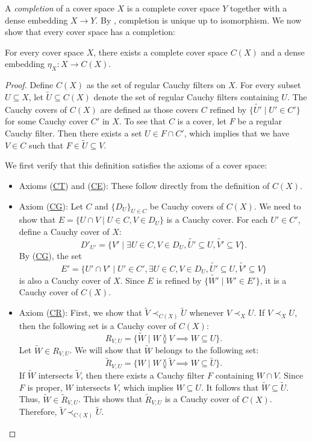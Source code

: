 \documentclass[pdflatex,sn-mathphys-num]{sn-jnl}
\newcommand{\axref}[1]{(\hyperref[ax:#1]{#1})}
\theoremstyle{definition}
\theoremstyle{remark}
\numberwithin{figure}{section}
\newcommand{\overlap}[2]{#1 \between #2}
\newcommand{\rb}{\prec}
\begin{document}
A \emph{completion} of a cover space $X$ is a complete cover space $Y$ together with a dense embedding $X \to Y$.
By , completion is unique up to isomorphism.
We now show that every cover space has a completion:

\begin{thm}[completion]
For every cover space $X$, there exists a complete cover space $C(X)$ and a dense embedding $\eta_X : X \to C(X)$.
\end{thm}
\begin{proof}
Define $C(X)$ as the set of regular Cauchy filters on $X$.
For every subset $U \subseteq X$, let $\widetilde{U} \subseteq C(X)$ denote the set of regular Cauchy filters containing $U$.
The Cauchy covers of $C(X)$ are defined as those covers $C$ refined by $\{ \widetilde{U'} \mid U' \in C' \}$ for some Cauchy cover $C'$ in $X$.
To see that $C$ is a cover, let $F$ be a regular Cauchy filter.
Then there exists a set $U \in F \cap C'$, which implies that we have $V \in C$ such that $F \in \widetilde{U} \subseteq V$.

We first verify that this definition satisfies the axioms of a cover space:
\begin{itemize}
\item Axioms \axref{CT} and \axref{CE}: These follow directly from the definition of $C(X)$.
\item Axiom \axref{CG}: Let $C$ and $\{ D_U \}_{U \in C}$ be Cauchy covers of $C(X)$.
        We need to show that $E = \{ U \cap V \mid U \in C, V \in D_U \}$ is a Cauchy cover.
        For each $U' \in C'$, define a Cauchy cover of $X$:
            \[ D'_{U'} = \{ V' \mid \exists U \in C, V \in D_U, \widetilde{U'} \subseteq U, \widetilde{V'} \subseteq V \}. \]
        By \axref{CG}, the set
            \[ E' = \{ U' \cap V' \mid U' \in C', \exists U \in C, V \in D_U, \widetilde{U'} \subseteq U, \widetilde{V'} \subseteq V \} \]
        is also a Cauchy cover of $X$.
        Since $E$ is refined by $\{ \widetilde{W'} \mid W' \in E' \}$, it is a Cauchy cover of $C(X)$.
\item Axiom \axref{CR}: First, we show that $\widetilde{V} \rb_{C(X)} \widetilde{U}$ whenever $V \rb_X U$.
        If $V \rb_X U$, then the following set is a Cauchy cover of $C(X)$:
            \[ R_{V,U} = \{ \widetilde{W} \mid \overlap{W}{V} \implies W \subseteq U \}. \]
        Let $\widetilde{W} \in R_{V,U}$.
        We will show that $\widetilde{W}$ belongs to the following set:
            \[ \widetilde{R}_{V,U} = \{ W \mid \overlap{W}{\widetilde{V}} \implies W \subseteq \widetilde{U} \}. \]
        If $\widetilde{W}$ intersects $\widetilde{V}$, then there exists a Cauchy filter $F$ containing $W \cap V$.
        Since $F$ is proper, $W$ intersects $V$, which implies $W \subseteq U$.
        It follows that $\widetilde{W} \subseteq \widetilde{U}$.
        Thus, $\widetilde{W} \in \widetilde{R}_{V,U}$.
        This shows that $\widetilde{R}_{V,U}$ is a Cauchy cover of $C(X)$.
        Therefore, $\widetilde{V} \rb_{C(X)} \widetilde{U}$.


\end{itemize}
\end{proof}
\end{document}
